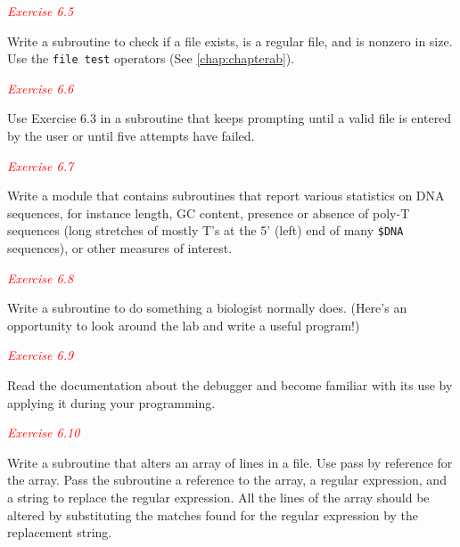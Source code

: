 \textcolor{red}{\textit{Exercise 6.5}}
\begin{adjustwidth}{2em}{}
Write a subroutine to check if a file exists, is a regular file, and is nonzero in size. Use the \verb|file test| operators (See \autoref{chap:chapterab}). 
\end{adjustwidth}

\textcolor{red}{\textit{Exercise 6.6}}
\begin{adjustwidth}{2em}{}
Use Exercise 6.3 in a subroutine that keeps prompting until a valid file is entered by the user or until five attempts have failed. 
\end{adjustwidth}

\textcolor{red}{\textit{Exercise 6.7}}
\begin{adjustwidth}{2em}{}
Write a module that contains subroutines that report various statistics on DNA sequences, for instance length, GC content, presence or absence of poly-T sequences (long stretches of mostly T's at the 5' (left) end of many \verb|$DNA| sequences), or other measures of interest. 
\end{adjustwidth}

\textcolor{red}{\textit{Exercise 6.8}}
\begin{adjustwidth}{2em}{}
Write a subroutine to do something a biologist normally does. (Here's an opportunity to look around the lab and write a useful program!) 
\end{adjustwidth}

\textcolor{red}{\textit{Exercise 6.9}}
\begin{adjustwidth}{2em}{}
Read the documentation about the debugger and become familiar with its use by applying it during your programming. 
\end{adjustwidth}

\textcolor{red}{\textit{Exercise 6.10}}
\begin{adjustwidth}{2em}{}
Write a subroutine that alters an array of lines in a file. Use pass by reference for the array. Pass the subroutine a reference to the array, a regular expression, and a string to replace the regular expression. All the lines of the array should be altered by substituting the matches found for the regular expression by the replacement string.
\end{adjustwidth}
